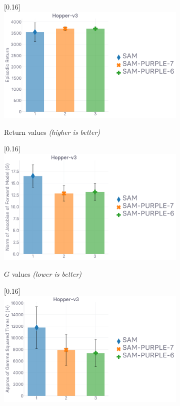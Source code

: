 \begin{figure}[H]
\begin{subfigure}[t]{0.33\textwidth}
  \end{subfigure}
  \begin{subfigure}[t]{0.33\textwidth}
    \center\scalebox{0.16}[0.16]{\includegraphics{Plots/purple_f_psi_hopper/plots_eval_env_ret_barplot.pdf}}
    \caption{Return values \textit{(higher is better)}}
  \end{subfigure}
  \begin{subfigure}[t]{0.33\textwidth}
    \center\scalebox{0.16}[0.16]{\includegraphics{Plots/purple_f_psi_hopper/plots_mod_2_barplot.pdf}}
    \caption{$G$ values \textit{(lower is better)}}
  \end{subfigure}
  \begin{subfigure}[t]{0.33\textwidth}
    \center\scalebox{0.16}[0.16]{\includegraphics{Plots/purple_f_psi_hopper/plots_gamma2c_barplot.pdf}}

\end{subfigure}
\end{figure}
